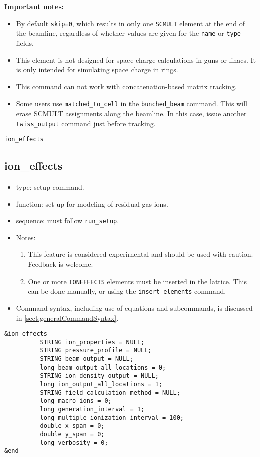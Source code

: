 \documentclass[11pt]{article}
\begin{document}
{\bf Important notes:}
\begin{itemize}
\item By default \verb|skip=0|, which results in only one \verb|SCMULT| element at the end of the beamline,
  regardless of whether values are given for the \verb|name| or \verb|type| fields.
\item This element is not designed for space charge calculations in guns or linacs.  It is only intended for
  simulating space charge in rings. 
\item This command can not work with concatenation-based matrix tracking.  
\item Some users use \verb|matched_to_cell| in the \verb|bunched_beam| command. 
  This will erase SCMULT assignments along the beamline. In this case, issue another \verb|twiss_output|
  command just before tracking.
\end{itemize}

\newpage
\begin{center}{\Large\verb|ion_effects|}\end{center}
\subsection{ion\_effects \label{subsec:ioneffects}}

\begin{itemize}
\item type: setup command.
\item function: set up for modeling of residual gas ions.
\item sequence: must follow \verb|run_setup|.
\item Notes:
  \begin{enumerate}
  \item This feature is considered experimental and should be used with caution.
    Feedback is welcome.
  \item One or more \verb|IONEFFECTS| elements must be inserted in the lattice. This can be
    done manually, or using the \verb|insert_elements| command.
  \end{enumerate}
\item Command syntax, including use of equations and subcommands, is discussed in \ref{sect:generalCommandSyntax}.
\end{itemize}

\begin{verbatim}
&ion_effects
          STRING ion_properties = NULL;
          STRING pressure_profile = NULL;
          STRING beam_output = NULL;
          long beam_output_all_locations = 0;
          STRING ion_density_output = NULL;
          long ion_output_all_locations = 1;
          STRING field_calculation_method = NULL;
          long macro_ions = 0;
          long generation_interval = 1;
          long multiple_ionization_interval = 100;
          double x_span = 0;
          double y_span = 0;
          long verbosity = 0;
&end
\end{verbatim}
\end{document}
